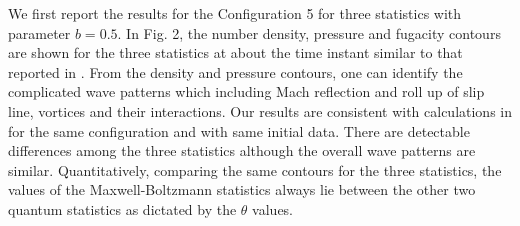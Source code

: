 \documentclass{rsproca}%
\begin{document}
We first report the results for the Configuration 5 for three statistics with parameter $b=0.5$.
In Fig. 2, the number density, pressure and fugacity contours are shown for the three statistics at about the time instant similar to that reported in \cite{Laxliu95}\cite{schultzrinne}.   From the density and pressure contours, one can identify the complicated wave patterns which including Mach reflection and roll up of slip line, vortices and their interactions.  Our results are consistent with calculations in \cite{Laxliu95}\cite{schultzrinne} for the same configuration and with same initial data.   There are detectable differences among the three statistics although the overall wave patterns are similar.  Quantitatively, comparing the same contours for the three statistics, the values of the Maxwell-Boltzmann statistics always lie between the other two quantum statistics as dictated by the $\theta$ values.
\end{document}
